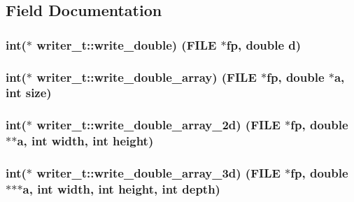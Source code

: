 \subsection{Field Documentation}
\subsubsection[{\texorpdfstring{write\+\_\+double}{write_double}}]{\setlength{\rightskip}{0pt plus 5cm}int($\ast$ writer\+\_\+t\+::write\+\_\+double) (F\+I\+LE $\ast$fp, double d)}\hypertarget{structwriter__t_a2e23cf6a55fd230fab640de4a5e642dd}{}\label{structwriter__t_a2e23cf6a55fd230fab640de4a5e642dd}
\subsubsection[{\texorpdfstring{write\+\_\+double\+\_\+array}{write_double_array}}]{\setlength{\rightskip}{0pt plus 5cm}int($\ast$ writer\+\_\+t\+::write\+\_\+double\+\_\+array) (F\+I\+LE $\ast$fp, double $\ast$a, int size)}\hypertarget{structwriter__t_ad32d593b6849dc3e337fe9247e079fa2}{}\label{structwriter__t_ad32d593b6849dc3e337fe9247e079fa2}
\subsubsection[{\texorpdfstring{write\+\_\+double\+\_\+array\+\_\+2d}{write_double_array_2d}}]{\setlength{\rightskip}{0pt plus 5cm}int($\ast$ writer\+\_\+t\+::write\+\_\+double\+\_\+array\+\_\+2d) (F\+I\+LE $\ast$fp, double $\ast$$\ast$a, int width, int height)}\hypertarget{structwriter__t_a98962d6be6e2fc295f83e6605273a49c}{}\label{structwriter__t_a98962d6be6e2fc295f83e6605273a49c}
\subsubsection[{\texorpdfstring{write\+\_\+double\+\_\+array\+\_\+3d}{write_double_array_3d}}]{\setlength{\rightskip}{0pt plus 5cm}int($\ast$ writer\+\_\+t\+::write\+\_\+double\+\_\+array\+\_\+3d) (F\+I\+LE $\ast$fp, double $\ast$$\ast$$\ast$a, int width, int height, int depth)}\hypertarget{structwriter__t_ac032437b1c445034b62ed0e94ad14825}{}\label{structwriter__t_ac032437b1c445034b62ed0e94ad14825}
